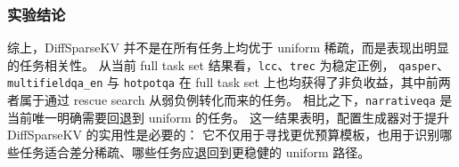 \subsubsection{实验结论}

综上，DiffSparseKV 并不是在所有任务上均优于 uniform 稀疏，而是表现出明显的任务相关性。
从当前 full task set 结果看，\texttt{lcc}、\texttt{trec} 为稳定正例，
\texttt{qasper}、\texttt{multifieldqa\_en} 与 \texttt{hotpotqa}
在 full task set 上也均获得了非负收益，其中前两者属于通过 rescue search 从弱负例转化而来的任务。
相比之下，\texttt{narrativeqa} 是当前唯一明确需要回退到 uniform 的任务。
这一结果表明，配置生成器对于提升 DiffSparseKV 的实用性是必要的：
它不仅用于寻找更优预算模板，也用于识别哪些任务适合差分稀疏、哪些任务应退回到更稳健的 uniform 路径。
